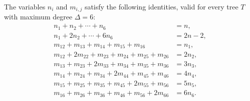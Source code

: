 \documentclass[preprint,12pt]{elsarticle}
\begin{document}
\medskip
The variables $n_i$ and $m_{i,j}$ satisfy the following identities, valid for every
tree $T$ with maximum degree $\Delta=6$:
\begin{align}
n_1+n_2+\cdots+n_6&=n, \label{eq:tree-sum-ni}\\
n_1+2n_2+\cdots+6n_6&=2n-2, \label{eq:tree-sum-deg}\\
m_{12}+m_{13}+m_{14}+m_{15}+m_{16}&=n_1, \label{eq:tree-ni-1}\\
m_{12}+2m_{22}+m_{23}+m_{24}+m_{25}+m_{26}&=2n_2, \label{eq:tree-ni-2}\\
m_{13}+m_{23}+2m_{33}+m_{34}+m_{35}+m_{36}&=3n_3, \label{eq:tree-ni-3}\\
m_{14}+m_{24}+m_{34}+2m_{44}+m_{45}+m_{46}&=4n_4, \label{eq:tree-ni-4}\\
m_{15}+m_{25}+m_{35}+m_{45}+2m_{55}+m_{56}&=5n_5, \label{eq:tree-ni-5}\\
m_{16}+m_{26}+m_{36}+m_{46}+m_{56}+2m_{66}&=6n_6. \label{eq:tree-ni-6}
\end{align}
\end{document}
